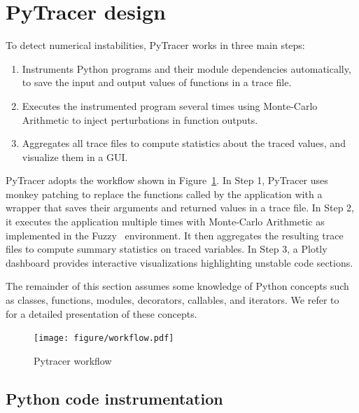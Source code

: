 \documentclass[10pt,journal,compsoc]{IEEEtran}
\newcommand{\pytracer}[0]{PyTracer\xspace}
\begin{document}
\section{\pytracer design}

To detect numerical instabilities, \pytracer works in three main steps:
\begin{enumerate}
    \item Instruments Python programs and their module dependencies
          automatically, to save the input and output values of functions in a
          trace file.
    \item Executes the instrumented program several times using Monte-Carlo
          Arithmetic to inject perturbations in function outputs.
    \item Aggregates all trace files to compute statistics about the traced
          values, and visualize them in a GUI.
\end{enumerate}
\pytracer adopts the workflow shown in Figure~\ref{fig:workflow}. In Step
1, \pytracer uses monkey patching to replace the functions called by the
application with a wrapper that saves their arguments and returned values in a
trace file. In Step 2, it executes the application multiple times with
Monte-Carlo Arithmetic as implemented in the Fuzzy~\cite{kiar2020comparing}
environment. It then aggregates the resulting trace files to compute summary
statistics on traced variables. In Step 3, a Plotly dashboard provides
interactive visualizations highlighting unstable code sections.

The remainder of this section assumes some knowledge of Python concepts such as
classes, functions, modules, decorators, callables, and iterators. We refer
to~\cite{beazley2013python} for a detailed presentation of these concepts.

\begin{figure}
    \centering
    \texttt{[image: figure/workflow.pdf]}
    \caption{Pytracer workflow
    }
    \label{fig:workflow}
\end{figure}

\subsection{Python code instrumentation}
\end{document}
